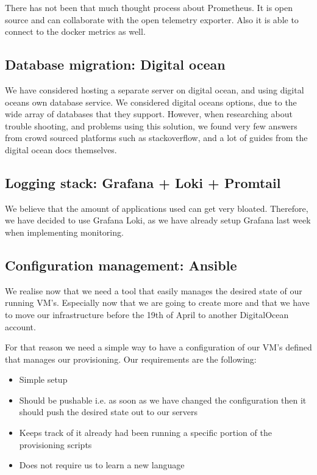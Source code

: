 There has not been that much thought process about Prometheus. It is open source and can collaborate with the open telemetry exporter. Also it is able to connect to the docker metrics as well.

\subsection{Database migration: Digital ocean}

We have considered hosting a separate server on digital ocean, and using digital oceans own database service. We considered digital oceans options, due to the wide array of databases that they support. However, when researching about trouble shooting, and problems using this solution, we found very few answers from crowd sourced platforms such as stackoverflow, and a lot of guides from the digital ocean docs themselves.

\subsection{Logging stack: Grafana + Loki + Promtail}

We believe that the amount of applications used can get very bloated. Therefore, we have decided to use Grafana Loki, as we have already setup Grafana last week when implementing monitoring.

\subsection{Configuration management: Ansible}

We realise now that we need a tool that easily manages the desired state of our running VM’s. Especially now that we are going to create more and that we have to move our infrastructure before the 19th of April to another DigitalOcean account.

For that reason we need a simple way to have a configuration of our VM’s defined that manages our provisioning. Our requirements are the following:

\begin{itemize}
    \item Simple setup
    \item Should be pushable i.e. as soon as we have changed the configuration then it should push the desired state out to our servers
    \item Keeps track of it already had been running a specific portion of the provisioning scripts
    \item Does not require us to learn a new language
\end{itemize}

